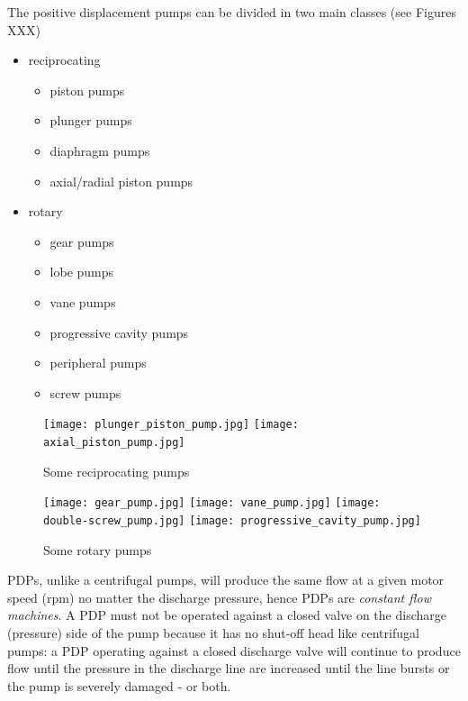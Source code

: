 The positive displacement pumps can be divided in two main classes (see Figures XXX)
\begin{itemize}
\item reciprocating
\begin{itemize}
\item piston pumps
\item plunger pumps
\item diaphragm pumps
\item axial/radial piston pumps
\end{itemize}
\item rotary
\begin{itemize}
\item gear pumps
\item lobe pumps
\item vane pumps
\item progressive cavity pumps
\item peripheral pumps
\item screw pumps
\end{itemize}
\end{itemize}

\begin{figure}[h!]
\begin{center}
\texttt{[image: plunger\_piston\_pump.jpg]}
\texttt{[image: axial\_piston\_pump.jpg]}
\caption{\label{fig:reiprocating_pumps}Some reciprocating pumps}
\end{center}
\end{figure}

\begin{figure}[h!]
\begin{center}
\texttt{[image: gear\_pump.jpg]}
\texttt{[image: vane\_pump.jpg]}
\texttt{[image: double-screw\_pump.jpg]}
\texttt{[image: progressive\_cavity\_pump.jpg]}
\caption{\label{fig:reiprocating_pumps}Some rotary pumps}
\end{center}
\end{figure}

PDPs, unlike a centrifugal pumps, will produce the same flow at a given motor speed (rpm) no matter the discharge pressure, hence PDPs are \emph{constant flow machines}. A PDP must not be operated against a closed valve on the discharge (pressure) side of the pump because it has no shut-off head like centrifugal pumps: a PDP operating against a closed discharge valve will continue to produce flow until the pressure in the discharge line are increased until the line bursts or the pump is severely damaged - or both.

